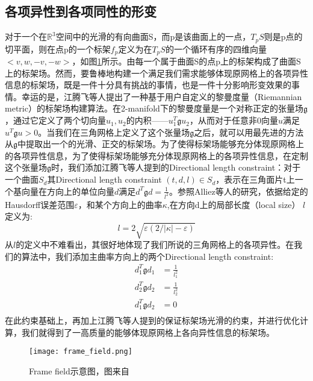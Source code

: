 \subsection{各项异性到各项同性的形变}
对于一个在$\mathbb{R}^3$空间中的光滑的有向曲面S，而p是该曲面上的一点，$T_pS$则是p点的切平面，则在点p的一个标架$f_p$定义为在$T_pS$的一个循环有序的四维向量$<v,w,−v,−w>$，如图\ref{fig:frame-field}所示。由每一个属于曲面S的点p上的标架构成了曲面S上的标架场。然而，要鲁棒地构建一个满足我们需求能够体现原网格上的各项异性信息的标架场，既是一件十分具有挑战的事情，也是一件十分影响形变效果的事情。幸运的是，江腾飞等人提出了一种基于用户自定义的黎曼度量（Riemannian metric）的标架场构建算法\cite{frame-field-gen}。在2-manifold下的黎曼度量是一个对称正定的张量场$\mathfrak{g}$，通过它定义了两个切向量$u_1, u_2$的内积——$u_1^T \mathfrak{g} u_2$，从而对于任意非0向量$u$满足$u^T \mathfrak{g} u>0$。当我们在三角网格上定义了这个张量场$\mathfrak{g}$之后，就可以用最先进的方法从$\mathfrak{g}$中提取出一个的光滑、正交的标架场。为了使得标架场能够充分体现原网格上的各项异性信息，为了使得标架场能够充分体现原网格上的各项异性信息，在定制这个张量场$\mathfrak{g}$时，我们添加江腾飞等人提到的Directional length constraint：对于一个曲面$S_d$其Directional length constraint $(t, d, l) \in S_d$，表示在三角面片t上一个基向量在方向上的单位向量$d$满足$d^T \mathfrak{g} d = \frac{1}{l^2}$。参照Alliez等人的研究\cite{remesh-length}，依据给定的Hausdorff误差范围$\varepsilon$，和某个方向上的曲率$\kappa$,在方向d上的局部长度（local size） $l$定义为:
\begin{equation}
  l = 2 \sqrt{\varepsilon(2/|\kappa| - \varepsilon)}
\end{equation}
从$l$的定义中不难看出，其很好地体现了我们所说的三角网格上的各项异性。在我们的算法中，我们添加主曲率方向上的两个Directional length constraint:
\begin{equation}
  \begin{split}
    d_1^T \mathfrak{g} d_1 &= \frac{1}{l_1^2}\\
    d_2^T \mathfrak{g} d_2 &= \frac{1}{l_2^2}\\
    d_1^T \mathfrak{g} d_2 &= 0\\
  \end{split}
\end{equation}
在此约束基础上，再加上江腾飞等人提到的保证标架场光滑的约束，并进行优化计算，我们就得到了一高质量的能够体现原网格上各向异性信息的标架场。\par
\begin{figure}[htbp]
    \centering
    \texttt{[image: frame\_field.png]}
    \caption{Frame field示意图，图来自\cite{isotopic-appro}}
    \label{fig:frame-field}
\end{figure}
